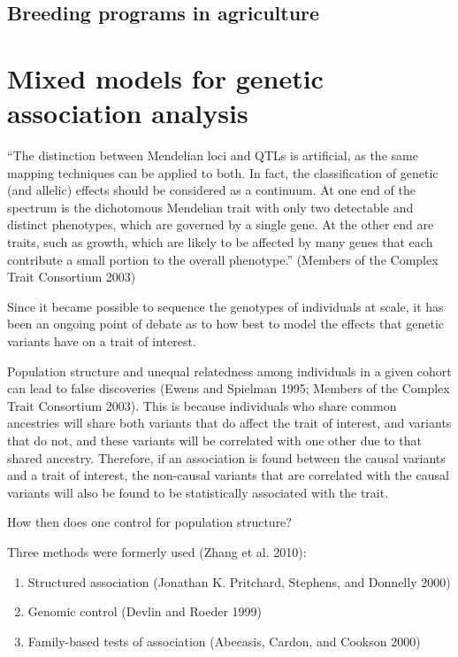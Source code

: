\documentclass[
]{book}
\begin{document}
\hypertarget{breeding-programs-in-agriculture}{%
\subsection{Breeding programs in agriculture}\label{breeding-programs-in-agriculture}}

\hypertarget{mixed-models-for-genetic-association-analysis}{%
\section{Mixed models for genetic association analysis}\label{mixed-models-for-genetic-association-analysis}}

``The distinction between Mendelian loci and QTLs is artificial, as the same mapping techniques can be applied to both. In fact, the classification of genetic (and allelic) effects should be considered as a continuum. At one end of the spectrum is the dichotomous Mendelian trait with only two detectable and distinct phenotypes, which are governed by a single gene. At the other end are traits, such as growth, which are likely to be affected by many genes that each contribute a small portion to the overall phenotype.'' (Members of the Complex Trait Consortium 2003)

Since it became possible to sequence the genotypes of individuals at scale, it has been an ongoing point of debate as to how best to model the effects that genetic variants have on a trait of interest.

Population structure and unequal relatedness among individuals in a given cohort can lead to false discoveries (Ewens and Spielman 1995; Members of the Complex Trait Consortium 2003). This is because individuals who share common ancestries will share both variants that do affect the trait of interest, and variants that do not, and these variants will be correlated with one other due to that shared ancestry. Therefore, if an association is found between the causal variants and a trait of interest, the non-causal variants that are correlated with the causal variants will also be found to be statistically associated with the trait.

How then does one control for population structure?

Three methods were formerly used (Zhang et al. 2010):

\begin{enumerate}
\def\labelenumi{\arabic{enumi}.}
\item
  Structured association (Jonathan K. Pritchard, Stephens, and Donnelly 2000)
\item
  Genomic control (Devlin and Roeder 1999)
\item
  Family-based tests of association (Abecasis, Cardon, and Cookson 2000)
\end{enumerate}
\end{document}
